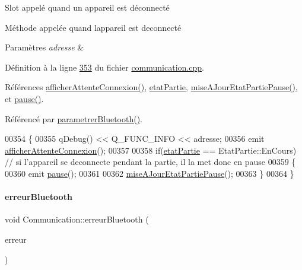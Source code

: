 Slot appelé quand un appareil est déconnecté 

Méthode appelée quand l\textquotesingle{}appareil est deconnecté


\begin{DoxyParams}{Paramètres}
{\em adresse} & \\
\hline
\end{DoxyParams}


Définition à la ligne \hyperlink{communication_8cpp_source_l00353}{353} du fichier \hyperlink{communication_8cpp_source}{communication.\+cpp}.



Références \hyperlink{class_communication_aff862483641966b73aa713b419b819a9}{afficher\+Attente\+Connexion()}, \hyperlink{communication_8h_source_l00100}{etat\+Partie}, \hyperlink{communication_8cpp_source_l00393}{mise\+A\+Jour\+Etat\+Partie\+Pause()}, et \hyperlink{class_communication_a369c7aeadc5c5926eb701bdebe53972c}{pause()}.



Référencé par \hyperlink{communication_8cpp_source_l00059}{parametrer\+Bluetooth()}.


\begin{DoxyCode}
00354 \{
00355     qDebug() << Q\_FUNC\_INFO << adresse;
00356     emit \hyperlink{class_communication_aff862483641966b73aa713b419b819a9}{afficherAttenteConnexion}();
00357 
00358     \textcolor{keywordflow}{if}(\hyperlink{class_communication_a2539ded2780db2c732690c585c768c96}{etatPartie} == EtatPartie::EnCours) \textcolor{comment}{// si l'appareil se deconnecte pendant la partie, il la
       met donc en pause}
00359     \{
00360         emit \hyperlink{class_communication_a369c7aeadc5c5926eb701bdebe53972c}{pause}();
00361 
00362         \hyperlink{class_communication_aaf8fbed545d460414fda14f23d5dca5d}{miseAJourEtatPartiePause}();
00363     \}
00364 \}
\end{DoxyCode}
\mbox{\label{class_communication_a9cb85e46b57b6dfa9e71408010bfc0a9}} 
\paragraph{\texorpdfstring{erreur\+Bluetooth}{erreurBluetooth}}
{\footnotesize\ttfamily void Communication\+::erreur\+Bluetooth (\begin{DoxyParamCaption}\item[{Q\+String}]{erreur }\end{DoxyParamCaption})\hspace{0.3cm}{\ttfamily [signal]}}



